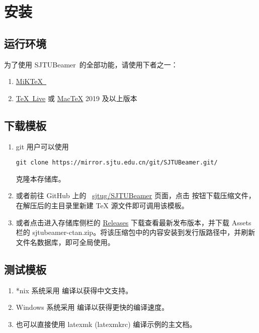 \documentclass[
    UTF8,
    heading=true,
    12pt,
    a4paper
]{ctexrep}
\def\themename{\textsf{SJTUBeamer}}
\begin{document}
\chapter{安装}

\section{运行环境}

为了使用 \themename\ 的全部功能，请使用下者之一：
\begin{enumerate}
  \item \href{https://mirrors.sjtug.sjtu.edu.cn/ctan/systems/win32/miktex/setup/windows-x64/}{MiK\TeX\ }
  \item \href{https://mirrors.sjtug.sjtu.edu.cn/ctan/systems/texlive/Images/}{\TeX\ Live} 或 \href{https://mirrors.sjtug.sjtu.edu.cn/ctan/systems/mac/mactex/}{Mac\TeX{}} 2019 及以上版本
\end{enumerate}

\section{下载模板}

\begin{enumerate}
  \item git 用户可以使用
        \begin{verbatim}git clone https://mirror.sjtu.edu.cn/git/SJTUBeamer.git/\end{verbatim}
        克隆本存储库。
  \item 或者前往 GitHub 上的 \faGithub{}~\href{https://github.com/sjtug/SJTUBeamer}{sjtug/SJTUBeamer} 页面，点击  按钮下载压缩文件，在解压后的主目录里新建 \TeX{} 源文件即可调用该模板。
  \item 或者点击进入存储库侧栏的 \href{https://github.com/sjtug/SJTUBeamer/releases}{\textsf{Releases}} 下载查看最新发布版本，并下载 \textsf{Assets} 栏的 \textsf{sjtubeamer-ctan.zip}。将该压缩包中的内容安装到发行版路径中，并刷新文件名数据库，即可全局使用。
\end{enumerate}

\section{测试模板}

\begin{enumerate}
  \item[ \faApple{} \faLinux] *nix 系统采用  编译以获得中文支持。
  \item[ \faWindows] Windows 系统采用  编译以获得更快的编译速度。
  \item[\faWrench] 也可以直接使用 \textsf{latexmk (latexmkrc)} 编译示例的主文档。
\end{enumerate}
\end{document}
